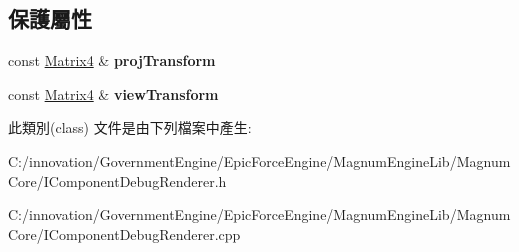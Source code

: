\subsection*{保護屬性}
\begin{DoxyCompactItemize}
\item 
const \hyperlink{class_i_dream_sky_1_1_matrix4}{Matrix4} \& {\bfseries proj\+Transform}\hypertarget{class_i_dream_sky_1_1_i_component_debug_renderer_a382de773ad1c674fe0204520b3194c5b}{}\label{class_i_dream_sky_1_1_i_component_debug_renderer_a382de773ad1c674fe0204520b3194c5b}

\item 
const \hyperlink{class_i_dream_sky_1_1_matrix4}{Matrix4} \& {\bfseries view\+Transform}\hypertarget{class_i_dream_sky_1_1_i_component_debug_renderer_a19b1da0c52075accff786cf0ef7af071}{}\label{class_i_dream_sky_1_1_i_component_debug_renderer_a19b1da0c52075accff786cf0ef7af071}

\end{DoxyCompactItemize}


此類別(class) 文件是由下列檔案中產生\+:\begin{DoxyCompactItemize}
\item 
C\+:/innovation/\+Government\+Engine/\+Epic\+Force\+Engine/\+Magnum\+Engine\+Lib/\+Magnum\+Core/I\+Component\+Debug\+Renderer.\+h\item 
C\+:/innovation/\+Government\+Engine/\+Epic\+Force\+Engine/\+Magnum\+Engine\+Lib/\+Magnum\+Core/I\+Component\+Debug\+Renderer.\+cpp\end{DoxyCompactItemize}

